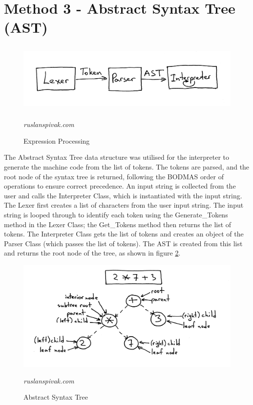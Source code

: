 \documentclass[a4paper, oneside, 11pt]{report}
\begin{document}
\section{Method 3 - Abstract Syntax Tree (AST)}

\begin{figure}[H]
    \centering
    \includegraphics[height=3.5cm]{expressionProcess.png}
    \caption{Expression Processing}
    \textit{ruslanspivak.com}
    \label{fig:expressionprocessing}
\end{figure}

The Abstract Syntax Tree data structure was utilised for the interpreter to generate the machine code from the list of tokens. The tokens are parsed, and the root node of the syntax tree is returned, following the BODMAS order of operations to ensure correct precedence. An input string is collected from the user and calls the Interpreter Class, which is instantiated with the input string. The Lexer first creates a list of characters from the user input string. The input string is looped through to identify each token using the Generate\_Tokens method in the Lexer Class; the Get\_Tokens method then returns the list of tokens. The Interpreter Class gets the list of tokens and creates an object of the Parser Class (which passes the list of tokens). The AST is created from this list and returns the root node of the tree, as shown in figure \ref{fig:AST}.

\begin{figure}[H]
    \centering
    \includegraphics[width=16.0cm]{AST.png}
    \caption{Abstract Syntax Tree}
    \textit{ruslanspivak.com}
    \label{fig:AST}
\end{figure}
\end{document}

